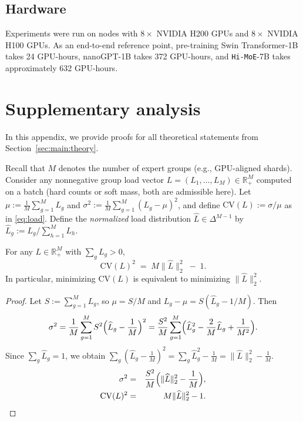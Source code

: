 \documentclass[sigconf,nonacm]{acmart}
\begin{document}


\subsection{Hardware}
\label{app:repro:hardware}

Experiments were run on nodes with $8\times$ NVIDIA H200 GPUs and $8\times$ NVIDIA H100 GPUs. As an end-to-end reference point, pre-training Swin Transformer-1B takes 24 GPU-hours, nanoGPT-1B takes 372 GPU-hours, and \texttt{Hi-MoE}-7B takes approximately 632 GPU-hours.

\section{Supplementary analysis}
\label{sec:theory}
In this appendix, we provide proofs for all theoretical statements from Section~\ref{sec:main:theory}.

Recall that $M$ denotes the number of expert groups (e.g., GPU-aligned shards). Consider any nonnegative group load vector
$L=(L_1,\dots,L_M)\in\mathbb{R}_+^M$ computed on a batch (hard counts or soft mass, both are admissible here).
Let $\mu := \frac{1}{M}\sum_{g=1}^M L_g$ and $\sigma^2 := \frac{1}{M}\sum_{g=1}^M (L_g-\mu)^2$, and define
$\mathrm{CV}(L):=\sigma/\mu$ as in \eqref{eq:load}.
Define the \emph{normalized} load distribution $\widehat L \in \Delta^{M-1}$ by
$\widehat L_g := L_g / \sum_{h=1}^M L_h$.

\begin{proposition}
\label{thm:cv-l2}
For any $L\in\mathbb{R}_+^M$ with $\sum_g L_g>0$,
\[
\mathrm{CV}(L)^2 \;=\; M\bigl\|\widehat L\bigr\|_2^2 \;-\; 1.
\]
In particular, minimizing $\mathrm{CV}(L)$ is equivalent to minimizing $\|\widehat L\|_2^2$.
\end{proposition}

\begin{proof}
Let $S:=\sum_{g=1}^M L_g$, so $\mu=S/M$ and $L_g-\mu=S(\widehat L_g-1/M)$.
Then
\[
\sigma^2
= \frac{1}{M}\sum_{g=1}^M S^2\Bigl(\widehat L_g-\frac{1}{M}\Bigr)^2
= \frac{S^2}{M}\sum_{g=1}^M \Bigl(\widehat L_g^2 - \frac{2}{M}\widehat L_g + \frac{1}{M^2}\Bigr).
\]
Since $\sum_g \widehat L_g = 1$, we obtain
$\sum_g (\widehat L_g-\frac{1}{M})^2 = \sum_g \widehat L_g^2 - \frac{1}{M} = \|\widehat L\|_2^2 - \frac{1}{M}$.
\begin{eqnarray*}
\sigma^2
&=& \frac{S^2}{M}\Bigl(\|\widehat L\|_2^2 - \frac{1}{M}\Bigr),\\
\mathrm{CV}(L)^2
&=& M\|\widehat L\|_2^2 - 1.
\end{eqnarray*}
\end{proof}
\end{document}
